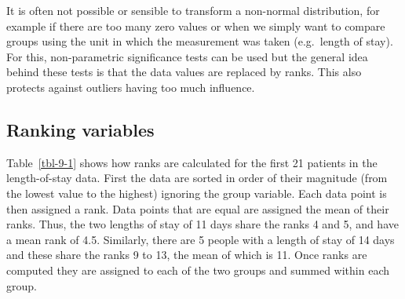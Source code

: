 \documentclass[
  a4paper,
]{memoir}
\begin{document}
It is often not possible or sensible to transform a non-normal
distribution, for example if there are too many zero values or when we
simply want to compare groups using the unit in which the measurement
was taken (e.g.~length of stay). For this, non-parametric significance
tests can be used but the general idea behind these tests is that the
data values are replaced by ranks. This also protects against outliers
having too much influence.

\subsection{Ranking variables}\label{ranking-variables}

Table~\ref{tbl-9-1} shows how ranks are calculated for the first 21
patients in the length-of-stay data. First the data are sorted in order
of their magnitude (from the lowest value to the highest) ignoring the
group variable. Each data point is then assigned a rank. Data points
that are equal are assigned the mean of their ranks. Thus, the two
lengths of stay of 11 days share the ranks 4 and 5, and have a mean rank
of 4.5. Similarly, there are 5 people with a length of stay of 14 days
and these share the ranks 9 to 13, the mean of which is 11. Once ranks
are computed they are assigned to each of the two groups and summed
within each group.
\end{document}
